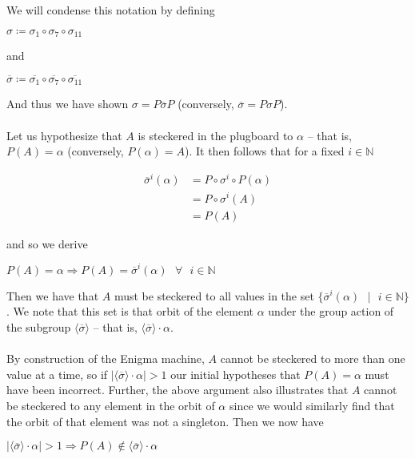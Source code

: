     We will condense this notation by defining
    \begin{center}
        $\sigma \coloneq \sigma_{1}\circ\sigma_7\circ\sigma_{11}$
    \end{center}
    and 
    \begin{center}
        $\overline{\sigma} \coloneq \overline{\sigma_{1}}\circ\overline{\sigma_7}\circ\overline{\sigma_{11}}$
    \end{center}
    And thus we have shown $\sigma = P\overline{\sigma}P$ (conversely, $\overline\sigma = P\sigma P$).
    \\\\Let us hypothesize that $A$ is steckered in the plugboard to $\alpha$ -- that is, $P(A) = \alpha$ (conversely, $P(\alpha) = A$). It then follows that for a fixed $i\in\mathbb{N}$
    \begin{center}
        \begin{align*}
            \overline{\sigma}^i(\alpha) &= P\circ\sigma^i\circ P(\alpha)
            \\&= P\circ\sigma^i(A)
            \\&= P(A)
        \end{align*}
    \end{center} 
    and so we derive 
    \begin{center}
        $P(A) = \alpha \Rightarrow P(A) = \overline{\sigma}^i(\alpha)\text{ }\forall\text{ }i\in\mathbb{N}$
    \end{center}
    Then we have that $A$ must be steckered to all values in the set $\{\overline{\sigma}^i(\alpha)\text{ }\vert\text{ }i\in\mathbb{N}\}$. 
    We note that this set is that orbit of the element $\alpha$ under the group action of the subgroup $\langle\overline{\sigma}\rangle$ -- that is, 
    $\langle\overline{\sigma}\rangle\cdot\alpha$. 
    \\\\By construction of the Enigma machine, $A$ cannot be steckered to more than one value at a time, so if $|\langle\overline{\sigma}\rangle\cdot\alpha| > 1$ our initial
    hypotheses that $P(A) = \alpha$ must have been incorrect. Further, the above argument also illustrates that $A$ cannot be steckered to any element in the orbit of $\alpha$ since 
    we would similarly find that the orbit of that element was not a singleton. Then we now have 
    \begin{center}
        $|\langle\overline{\sigma}\rangle\cdot\alpha| > 1 \Rightarrow P(A) \notin \langle\overline{\sigma}\rangle\cdot\alpha$
    \end{center} 
